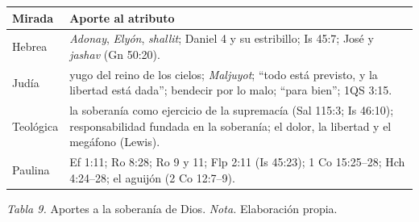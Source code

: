 \documentclass[11pt,letterpaper]{article}
\begin{document}
\begin{center}\small\renewcommand{\arraystretch}{1.18}
\begin{tabular}{@{}L{2.8cm}L{11.0cm}@{}}
\toprule
\textbf{Mirada} & \textbf{Aporte al atributo} \\ \midrule
Hebrea & \emph{Adonay}, \emph{Elyón}, \emph{shallit}; Daniel 4 y su estribillo; Is 45:7; José y \emph{jashav} (Gn 50:20). \\
Judía & yugo del reino de los cielos; \emph{Maljuyot}; ``todo está previsto, y la libertad está dada''; bendecir por lo malo; ``para bien''; 1QS 3:15. \\
Teológica & la soberanía como ejercicio de la supremacía (Sal 115:3; Is 46:10); responsabilidad fundada en la soberanía; el dolor, la libertad y el megáfono (Lewis). \\
Paulina & Ef 1:11; Ro 8:28; Ro 9 y 11; Flp 2:11 (Is 45:23); 1 Co 15:25--28; Hch 4:24--28; el aguijón (2 Co 12:7--9). \\
\bottomrule
\end{tabular}\par
{\footnotesize\color{gris}\textit{Tabla 9.} Aportes a la soberanía de Dios. \textit{Nota.} Elaboración propia.}
\end{center}

\end{document}
